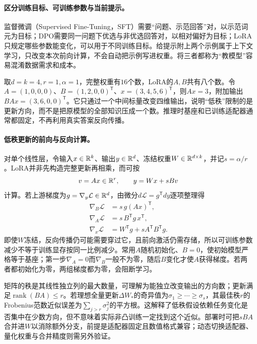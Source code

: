 \paragraph{区分训练目标、可训练参数与当前提示。}
监督微调（Supervised Fine-Tuning，SFT）需要“问题、示范回答”对，以示范词元为目标；DPO需要同一问题下优选与非优选回答对，以相对偏好为目标；LoRA只规定哪些参数能变化，可以用于不同训练目标。给提示附上两个示例属于上下文学习，只改变本次前向计算，不会自动把示例写进权重。将三者都称为“教模型”容易混淆数据需求和成本。

取$d=k=4,r=1,\alpha=1$，完整权重有$16$个数，LoRA的$A,B$共有八个数。令$A=(1,0,0,0)$、$B=(1,2,0,0)^{\mathsf T}$、$x=(3,4,5,6)^{\mathsf T}$，则$Ax=3$，附加输出$BAx=(3,6,0,0)^{\mathsf T}$。它只通过一个中间标量改变四维输出，说明“低秩”限制的是更新方向，而不是把原模型的全部知识压成一个数。推理时基座和已训练适配器通常都固定，不再利用真实答案反向传播。

\paragraph{低秩更新的前向与反向计算。}
对单个线性层，令输入$x\in\mathbb{R}^k$、输出$y\in\mathbb{R}^d$、冻结权重$W\in\mathbb{R}^{d\times k}$，并记$s=\alpha/r$。LoRA并非先构造完整更新再相乘，而可按
\begin{equation}
 v=Ax\in\mathbb{R}^r,\qquad y=Wx+sBv
\end{equation}
计算。若上游梯度为$g=\nabla_y\mathcal L\in\mathbb{R}^d$，由微分$d\mathcal L=g^{\mathsf T}dy$逐项整理得
\begin{align}
 \nabla_B\mathcal L&=s\,g(Ax)^{\mathsf T},\\
 \nabla_A\mathcal L&=s\,B^{\mathsf T}g\,x^{\mathsf T},\\
 \nabla_x\mathcal L&=W^{\mathsf T}g+sA^{\mathsf T}B^{\mathsf T}g.
\end{align}
即使$W$冻结，反向传播仍可能需要穿过它，且前向激活仍需存储，所以可训练参数减少不等于训练显存按同一比例减少。常用$A$随机初始化、$B=0$，使初始模型严格等于基座；第一步$\nabla_A=0$而$\nabla_B$一般不为零，随后$B$变化才使$A$获得梯度。若两者都初始化为零，两组梯度都为零，会阻断学习。

矩阵的秩是其线性独立列的最大数量，可理解为能独立改变输出的方向数；更新满足$\operatorname{rank}(BA)\leq r$。若理想全量更新$\Delta W_*$的奇异值为$\sigma_1\geq\cdots\geq\sigma_s$，其最佳秩$r$的Frobenius范数近似误差为$\sum_{j>r}\sigma_j^2$的平方根。这解释了低秩假设依赖任务变化是否集中在少数方向，但不意味着实际非凸训练一定找到这个近似。部署时可把$sBA$合并进$W$以消除额外分支，前提是适配器固定且数值格式兼容；动态切换适配器、量化权重与合并精度则需另外验证。

